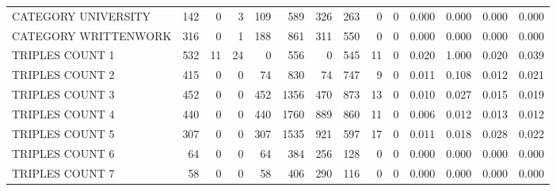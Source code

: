 \begin{tabular}{lrrrrrrrrrllll}
 CATEGORY UNIVERSITY      &             142 &             0 &               3 &             109 &             589 &  326 &  263 &    0 &    0 & 0.000 & 0.000 & 0.000 & 0.000 \\
 CATEGORY WRITTENWORK     &             316 &             0 &               1 &             188 &             861 &  311 &  550 &    0 &    0 & 0.000 & 0.000 & 0.000 & 0.000 \\
 TRIPLES COUNT 1          &             532 &            11 &              24 &               0 &             556 &    0 &  545 &   11 &    0 & 0.020 & 1.000 & 0.020 & 0.039 \\
 TRIPLES COUNT 2          &             415 &             0 &               0 &              74 &             830 &   74 &  747 &    9 &    0 & 0.011 & 0.108 & 0.012 & 0.021 \\
 TRIPLES COUNT 3          &             452 &             0 &               0 &             452 &            1356 &  470 &  873 &   13 &    0 & 0.010 & 0.027 & 0.015 & 0.019 \\
 TRIPLES COUNT 4          &             440 &             0 &               0 &             440 &            1760 &  889 &  860 &   11 &    0 & 0.006 & 0.012 & 0.013 & 0.012 \\
 TRIPLES COUNT 5          &             307 &             0 &               0 &             307 &            1535 &  921 &  597 &   17 &    0 & 0.011 & 0.018 & 0.028 & 0.022 \\
 TRIPLES COUNT 6          &              64 &             0 &               0 &              64 &             384 &  256 &  128 &    0 &    0 & 0.000 & 0.000 & 0.000 & 0.000 \\
 TRIPLES COUNT 7          &              58 &             0 &               0 &              58 &             406 &  290 &  116 &    0 &    0 & 0.000 & 0.000 & 0.000 & 0.000 \\
\hline
\end{tabular}